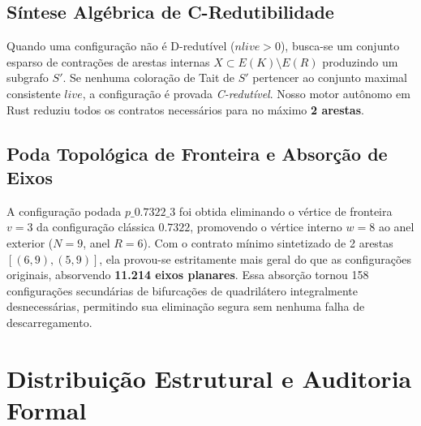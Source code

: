 \documentclass[11pt,a4paper]{article}
\begin{document}
\subsection{Síntese Algébrica de C-Redutibilidade}
Quando uma configuração não é D-redutível ($nlive > 0$), busca-se um conjunto esparso de contrações de arestas internas $X \subset E(K) \setminus E(R)$ produzindo um subgrafo $S'$. Se nenhuma coloração de Tait de $S'$ pertencer ao conjunto maximal consistente $live$, a configuração é provada \emph{C-redutível}. Nosso motor autônomo em Rust reduziu todos os contratos necessários para no máximo \textbf{2 arestas}.

\subsection{Poda Topológica de Fronteira e Absorção de Eixos}
A configuração podada $p\_0.7322\_3$ foi obtida eliminando o vértice de fronteira $v=3$ da configuração clássica $0.7322$, promovendo o vértice interno $w=8$ ao anel exterior ($N=9$, anel $R=6$). Com o contrato mínimo sintetizado de 2 arestas $[(6, 9), (5, 9)]$, ela provou-se estritamente mais geral do que as configurações originais, absorvendo \textbf{11.214 eixos planares}. Essa absorção tornou 158 configurações secundárias de bifurcações de quadrilátero integralmente desnecessárias, permitindo sua eliminação segura sem nenhuma falha de descarregamento.

\section{Distribuição Estrutural e Auditoria Formal}
\end{document}
